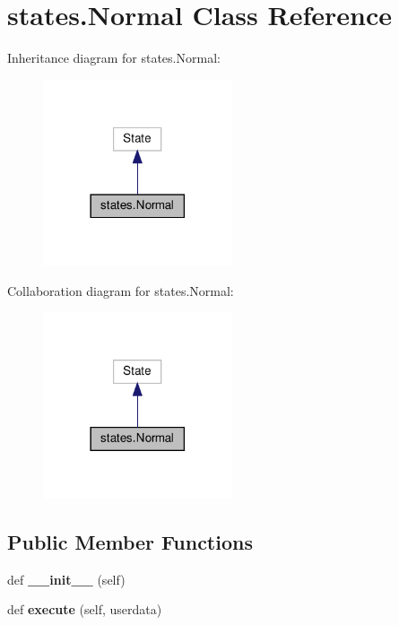 \hypertarget{classstates_1_1Normal}{}\section{states.\+Normal Class Reference}
\label{classstates_1_1Normal}


Inheritance diagram for states.\+Normal\+:
\nopagebreak
\begin{figure}[H]
\begin{center}
\leavevmode
\includegraphics[width=158pt]{classstates_1_1Normal__inherit__graph}
\end{center}
\end{figure}


Collaboration diagram for states.\+Normal\+:
\nopagebreak
\begin{figure}[H]
\begin{center}
\leavevmode
\includegraphics[width=158pt]{classstates_1_1Normal__coll__graph}
\end{center}
\end{figure}
\subsection*{Public Member Functions}
\begin{DoxyCompactItemize}
\item 
\mbox{\label{classstates_1_1Normal_a9b1148268037056e7ec1305beed8f472}} 
def {\bfseries \+\_\+\+\_\+init\+\_\+\+\_\+} (self)
\item 
\mbox{\label{classstates_1_1Normal_a8b5049c559f5374596d80003a21c0e20}} 
def {\bfseries execute} (self, userdata)
\end{DoxyCompactItemize}


